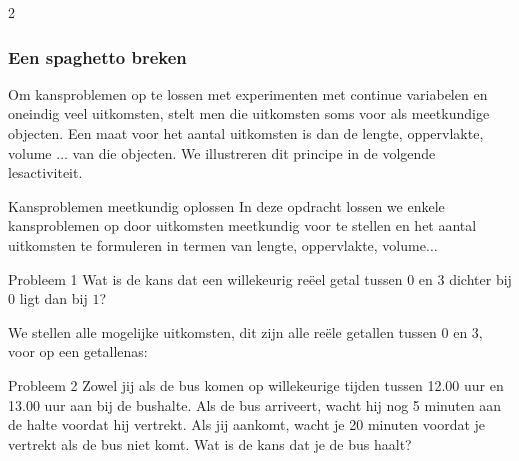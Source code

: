 \begin{multicols}{2}
	\subsubsection{Een spaghetto breken}
	Om kansproblemen op te lossen met experimenten met continue variabelen en oneindig veel uitkomsten, stelt men die uitkomsten soms voor als meetkundige objecten. Een maat voor het aantal uitkomsten is dan de lengte, oppervlakte, volume $\ldots$ van die objecten. We illustreren dit principe in de volgende lesactiviteit.

 \vfill
 \clearpage

	
\end{multicols}

\begin{lesactiviteit}{Kansproblemen meetkundig oplossen}
	In deze opdracht lossen we enkele kansproblemen op door uitkomsten meetkundig voor te stellen en het aantal uitkomsten te formuleren in termen van lengte, oppervlakte, volume$\ldots$\\
	
	\begin{kader}{}{Probleem 1}
		Wat is de kans dat een willekeurig reëel getal tussen $0$ en $3$ dichter bij $0$ ligt dan bij $1$?
	\end{kader}
	
	We stellen alle mogelijke uitkomsten, dit zijn alle reële getallen tussen $0$ en $3$, voor op een  getallenas:
	
	 	

	\begin{vraagenantwoord}	

	\end{vraagenantwoord}

	\vspace{0.5cm}
	\begin{kader}{}{Probleem 2}
		Zowel jij als de bus komen op willekeurige tijden tussen 12.00 uur en 13.00 uur aan bij de bushalte. Als de bus arriveert, wacht hij nog 5 minuten aan de halte voordat hij vertrekt. Als jij aankomt, wacht je 20 minuten voordat je vertrekt als de bus niet komt. Wat is de kans dat je de bus haalt?
	\end{kader}


\end{lesactiviteit}
